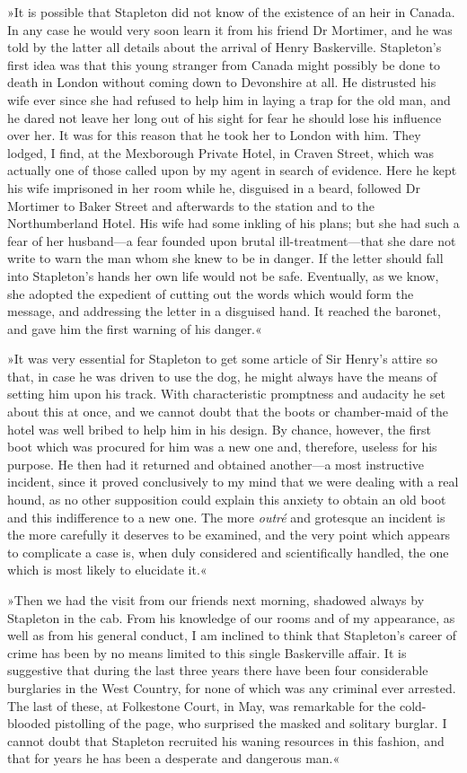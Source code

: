 »It is possible that Stapleton did not know of the existence of an heir in Canada. In any case he would very soon learn it from his friend Dr Mortimer, and he was told by the latter all details about the arrival of Henry Baskerville. Stapleton's first idea was that this young stranger from Canada might possibly be done to death in London without coming down to Devonshire at all. He distrusted his wife ever since she had refused to help him in laying a trap for the old man, and he dared not leave her long out of his sight for fear he should lose his influence over her. It was for this reason that he took her to London with him. They lodged, I find, at the Mexborough Private Hotel, in Craven Street, which was actually one of those called upon by my agent in search of evidence. Here he kept his wife imprisoned in her room while he, disguised in a beard, followed Dr Mortimer to Baker Street and afterwards to the station and to the Northumberland Hotel. His wife had some inkling of his plans; but she had such a fear of her husband—a fear founded upon brutal ill-treatment—that she dare not write to warn the man whom she knew to be in danger. If the letter should fall into Stapleton's hands her own life would not be safe. Eventually, as we know, she adopted the expedient of cutting out the words which would form the message, and addressing the letter in a disguised hand. It reached the baronet, and gave him the first warning of his danger.«

»It was very essential for Stapleton to get some article of Sir Henry's attire so that, in case he was driven to use the dog, he might always have the means of setting him upon his track. With characteristic promptness and audacity he set about this at once, and we cannot doubt that the boots or chamber-maid of the hotel was well bribed to help him in his design. By chance, however, the first boot which was procured for him was a new one and, therefore, useless for his purpose. He then had it returned and obtained another—a most instructive incident, since it proved conclusively to my mind that we were dealing with a real hound, as no other supposition could explain this anxiety to obtain an old boot and this indifference to a new one. The more \textit{outré} and grotesque an incident is the more carefully it deserves to be examined, and the very point which appears to complicate a case is, when duly considered and scientifically handled, the one which is most likely to elucidate it.«

»Then we had the visit from our friends next morning, shadowed always by Stapleton in the cab. From his knowledge of our rooms and of my appearance, as well as from his general conduct, I am inclined to think that Stapleton's career of crime has been by no means limited to this single Baskerville affair. It is suggestive that during the last three years there have been four considerable burglaries in the West Country, for none of which was any criminal ever arrested. The last of these, at Folkestone Court, in May, was remarkable for the cold-blooded pistolling of the page, who surprised the masked and solitary burglar. I cannot doubt that Stapleton recruited his waning resources in this fashion, and that for years he has been a desperate and dangerous man.«

